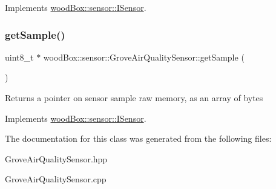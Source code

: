 Implements \mbox{\hyperlink{classwood_box_1_1sensor_1_1_i_sensor_afb01c2473efc4a823bf5dada0048d2bc}{wood\+Box\+::sensor\+::\+I\+Sensor}}.

\mbox{\label{classwood_box_1_1sensor_1_1_grove_air_quality_sensor_a204d677110c9fe3c6b495bf9112e9afd}} 
\subsubsection{\texorpdfstring{get\+Sample()}{getSample()}}
{\footnotesize\ttfamily uint8\+\_\+t $\ast$ wood\+Box\+::sensor\+::\+Grove\+Air\+Quality\+Sensor\+::get\+Sample (\begin{DoxyParamCaption}{ }\end{DoxyParamCaption})\hspace{0.3cm}{\ttfamily [virtual]}}

Returns a pointer on sensor sample raw memory, as an array of bytes 

Implements \mbox{\hyperlink{classwood_box_1_1sensor_1_1_i_sensor_a9de8041b991b76cc2f6fcc3b6a1bf363}{wood\+Box\+::sensor\+::\+I\+Sensor}}.



The documentation for this class was generated from the following files\+:\begin{DoxyCompactItemize}
\item 
Grove\+Air\+Quality\+Sensor.\+hpp\item 
Grove\+Air\+Quality\+Sensor.\+cpp\end{DoxyCompactItemize}
